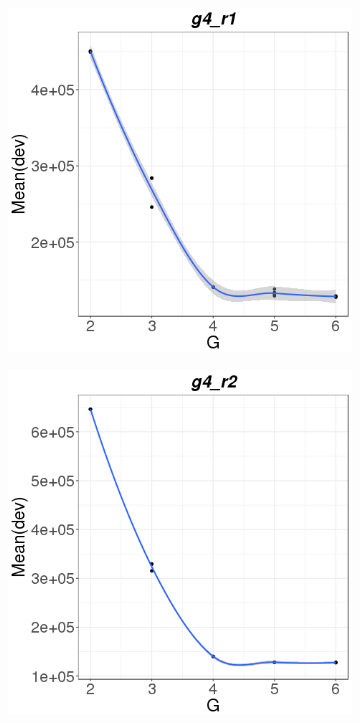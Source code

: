 \documentclass{spbau-diploma}
\begin{document}
\begin{figure}
    \hfill
      
   \begin{subfigure}[b]{0.4\textwidth}
        \includegraphics[width=\textwidth]{pics/devs/g4_r1.png}
    \end{subfigure}
    \qquad
    \begin{subfigure}[b]{0.4\textwidth}
        \includegraphics[width=\textwidth]{pics/devs/g4_r2.png}
    \end{subfigure}
      

\end{figure}
\end{document}

